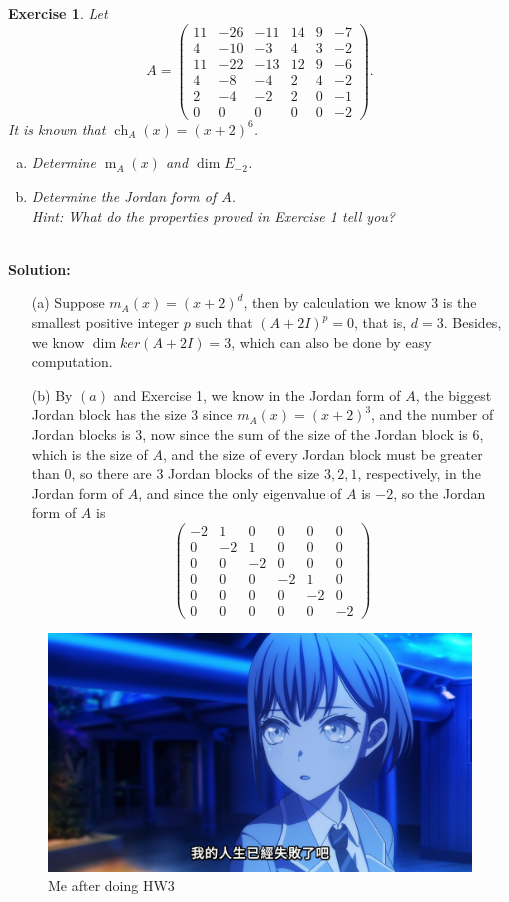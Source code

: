 \documentclass[a4paper]{article}
\theoremstyle{mystyle}
\newtheorem{exercise}[theorem]{Exercise}
\newcommand{\6}{\partial}
\DeclareMathOperator{\ch}{ch}
\DeclareMathOperator{\m}{m}
\begin{document}
\begin{exercise}
    Let
    $$
    A=\begin{pmatrix}
        11 & -26 & -11 & 14 & 9 & -7\\
        4 & -10 & -3 & 4 & 3 & -2 \\
        11 & -22 & -13 & 12 & 9 & -6 \\
        4 & -8 & -4 & 2 & 4 & -2 \\
        2 & -4 & -2 & 2 & 0 & -1\\
        0 & 0 & 0 & 0 & 0 & -2
    \end{pmatrix}.
    $$
    It is known that $\ch_A(x)=(x+2)^6$. 
    \begin{enumerate}[(a)]
        \item Determine $\m_A(x)$ and $\dim E_{-2}$.
        \item Determine the Jordan form of $A$. \\
        \textit{Hint}: What do the properties proved in Exercise 1 tell you?
    \end{enumerate} 
\end{exercise}
\hfill \\ \textbf{Solution: }
\begin{itemize}
    \item [(a)] Suppose $m_A(x)=(x+2)^d$, then by calculation we know $3$ is the smallest positive integer $p$ such that $(A+2I)^p=0$, that is, $d=3$.
    Besides, we know $\dim ker(A+2I)=3$, which can also be done by easy computation.
    \item [(b)] By $(a)$ and Exercise 1, we know in the Jordan form of $A$, the biggest Jordan block has the size $3$ since $m_A(x)=(x+2)^3$, and the number 
    of Jordan blocks is $3$, now since the sum of the size of the Jordan block is $6$, which is the size of $A$, and the size of every Jordan block must be greater than $0$, 
    so there are $3$ Jordan blocks of the size $3,2,1$, respectively, in the Jordan form of $A$, and since the only eigenvalue of $A$ is $-2$, so the Jordan form of $A$ is
    \[
    \begin{pmatrix}
        -2 &1 &0 &0 &0 &0 \\ 
        0 &-2 &1 &0 &0 &0 \\ 
        0 &0 &-2 &0 &0 &0 \\ 
        0 &0 &0 &-2 &1 &0 \\ 
        0 &0 &0 &0 &-2 &0 \\ 
        0 &0 &0 &0 &0 &-2
    \end{pmatrix} 
    \]
\end{itemize}

\begin{figure}[h]
    \includegraphics[width=\textwidth]{我的人生已經失敗了吧.jpg}
    \caption{Me after doing HW3}
\end{figure}
\end{document}
